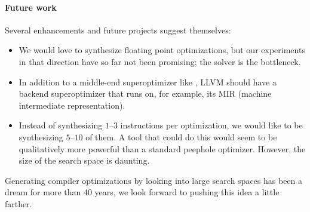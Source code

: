 \paragraph{Future work}
%
Several enhancements and future projects suggest themselves:
%
\begin{itemize}
\item
We would love to synthesize floating point optimizations, but our
experiments in that direction have so far not been promising; the
solver is the bottleneck.
\item
In addition to a middle-end superoptimizer like \minotaur{}, LLVM should
have a backend superoptimizer that runs on, for example, its MIR
(machine intermediate representation).
\item
Instead of synthesizing $1$--$3$ instructions per optimization, we would
like to be synthesizing $5$--$10$ of them.
%
A tool that could do this would seem to be qualitatively more powerful
than a standard peephole optimizer.
%
However, the size of the search space is daunting.
\end{itemize}
%
Generating compiler optimizations by looking into large search spaces
has been a dream for more than 40 years, we look forward to pushing
this idea a little farther.
\fi


